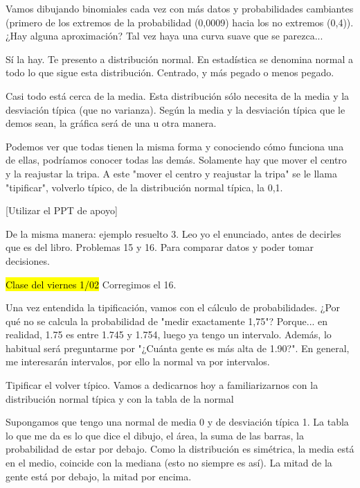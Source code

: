 
Vamos dibujando binomiales cada vez con más datos y probabilidades cambiantes (primero de los extremos de la probabilidad (0,0009) hacia los no extremos (0,4)). ¿Hay alguna aproximación? Tal vez haya una curva suave que se parezca...

Sí la hay.  Te presento a distribución normal. En estadística se denomina normal a todo lo que sigue esta distribución. Centrado, y más pegado o menos pegado.

Casi todo está cerca de la media. Esta distribución sólo necesita de la media y la desviación típica (que no varianza). Según la media y la desviación típica que le demos sean, la gráfica será de una u otra manera.

Podemos ver que todas tienen la misma forma y conociendo cómo funciona una de ellas, podríamos conocer todas las demás. Solamente hay que mover el centro y la reajustar la tripa. A este "mover el centro y reajustar la tripa" se le llama "tipificar", volverlo típico, de la distribución normal típica, la 0,1. 

[Utilizar el PPT de apoyo]


De la misma manera: ejemplo resuelto 3. Leo yo el enunciado, antes de decirles que es del libro. Problemas 15 y 16. Para comparar datos y poder tomar decisiones. 


\hl{Clase del viernes 1/02}
Corregimos el 16.

Una vez entendida la tipificación, vamos con el cálculo de probabilidades. ¿Por qué no se calcula la probabilidad de "medir exactamente 1,75"? Porque... en realidad, 1.75 es entre 1.745 y 1.754, luego ya tengo un intervalo. 
Además, lo habitual será preguntarme por "¿Cuánta gente es más alta de 1.90?". En general, me interesarán intervalos, por ello la normal va por intervalos.

Tipificar el volver típico. Vamos a dedicarnos hoy a familiarizarnos con la distribución normal típica y con la tabla de la normal

Supongamos que tengo una normal de media 0 y de desviación típica 1. La tabla lo que me da es lo que dice el dibujo, el área, la suma de las barras, la probabilidad de estar por debajo. Como la distribución es simétrica, la media está en el medio, coincide con la mediana (esto no siempre es así). La mitad de la gente está por debajo, la mitad por encima.

